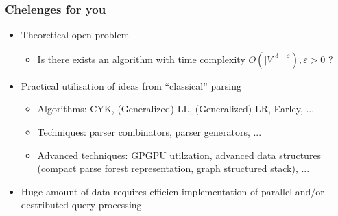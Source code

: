 \documentclass[xcolor=table,aspectratio=169]{beamer}
\begin{document}
\begin{frame}[fragile]
  \transwipe[direction=90]
  \frametitle{Chelenges for you}
  \begin{itemize}
  \item Theoretical open problem
    \begin{itemize}
        \item Is there exists an algorithm with time complexity $O(|V|^{3-\varepsilon}), 
        \varepsilon > 0$ ?
    \end{itemize}
  \item Practical utilisation of ideas from ``classical'' parsing
    \begin{itemize}
        \item Algorithms: CYK, (Generalized) LL, (Generalized) LR, Earley, ...
        \item Techniques: parser combinators, parser generators, ... 
        \item Advanced techniques: GPGPU utilzation, advanced data structures (compact parse forest representation, graph structured stack), ...
    \end{itemize}
  \item Huge amount of data requires efficien implementation of parallel and/or destributed query processing
  \end{itemize}

\end{frame}
\end{document}

